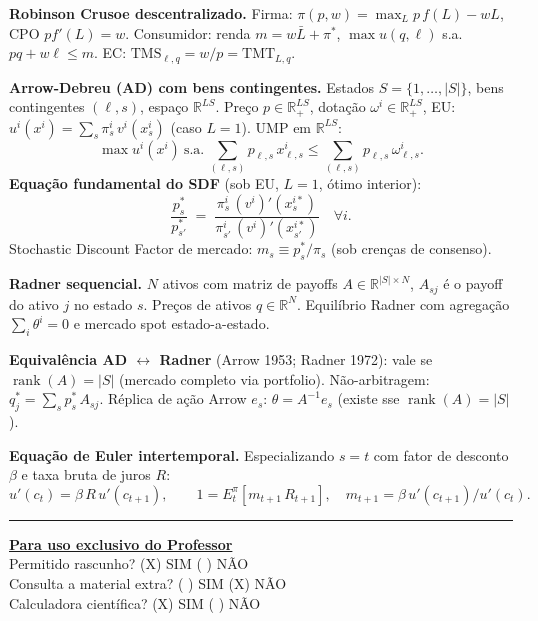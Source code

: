 \documentclass[11pt,addpoints]{exam}
\newcommand{\TMS}{\text{TMS}}
\newcommand{\TMT}{\text{TMT}}
\newcommand{\rank}{\operatorname{rank}}
\begin{document}
    \textbf{Robinson Crusoe descentralizado.} Firma: $\pi(p, w) = \max_L p\, f(L) - w L$, CPO $p f'(L) = w$. Consumidor: renda $m = w \bar L + \pi^*$, $\max u(q, \ell)$ s.a.\ $p q + w \ell \leq m$. EC: $\TMS_{\ell, q} = w/p = \TMT_{L, q}$.

    \textbf{Arrow-Debreu (AD) com bens contingentes.} Estados $S = \{1, \ldots, |S|\}$, bens contingentes $(\ell, s)$, espaço $\mathbb{R}^{LS}$. Preço $p \in \mathbb{R}^{LS}_+$, dotação $\omega^i \in \mathbb{R}^{LS}_+$, EU: $u^i(x^i) = \sum_s \pi^i_s\, v^i(x^i_s)$ (caso $L = 1$). UMP em $\mathbb{R}^{LS}$:
    \[
        \max u^i(x^i)\ \text{s.a.}\ \sum_{(\ell,s)} p_{\ell, s}\, x^i_{\ell, s} \leq \sum_{(\ell,s)} p_{\ell, s}\, \omega^i_{\ell, s}.
    \]
    \textbf{Equação fundamental do SDF} (sob EU, $L = 1$, ótimo interior):
    \[
        \boxed{\ \frac{p^*_s}{p^*_{s'}} \;=\; \frac{\pi^i_s\, (v^i)'(x^{i*}_s)}{\pi^i_{s'}\, (v^i)'(x^{i*}_{s'})}\quad \forall i.\ }
    \]
    Stochastic Discount Factor de mercado: $m_s \equiv p^*_s / \pi_s$ (sob crenças de consenso).

    \textbf{Radner sequencial.} $N$ ativos com matriz de payoffs $A \in \mathbb{R}^{|S| \times N}$, $A_{sj}$ é o payoff do ativo $j$ no estado $s$. Preços de ativos $q \in \mathbb{R}^N$. Equilíbrio Radner com agregação $\sum_i \theta^i = 0$ e mercado spot estado-a-estado.

    \textbf{Equivalência AD $\leftrightarrow$ Radner} (Arrow 1953; Radner 1972): vale se $\rank(A) = |S|$ (mercado completo via portfolio). Não-arbitragem: $q^*_j = \sum_s p^*_s\, A_{sj}$. Réplica de ação Arrow $e_s$: $\theta = A^{-1} e_s$ (existe sse $\rank(A) = |S|$).

    \textbf{Equação de Euler intertemporal.} Especializando $s = t$ com fator de desconto $\beta$ e taxa bruta de juros $R$:
    \[
        u'(c_t) = \beta\, R\, u'(c_{t+1}),\qquad 1 = E^\pi_t[m_{t+1}\, R_{t+1}],\quad m_{t+1} = \beta\, u'(c_{t+1})/u'(c_t).
    \]

    \vspace{0.5em}
    \hrule
    \vspace{1em}
    \noindent\textbf{\underline{Para uso exclusivo do Professor}} \\[0.2em]

    Permitido rascunho? \hfill (X) SIM \quad (   ) NÃO\\[0.3em]
    Consulta a material extra? \hfill (   ) SIM \quad (X) NÃO\\[0.3em]
    Calculadora científica? \hfill (X) SIM \quad (   ) NÃO
\end{document}
